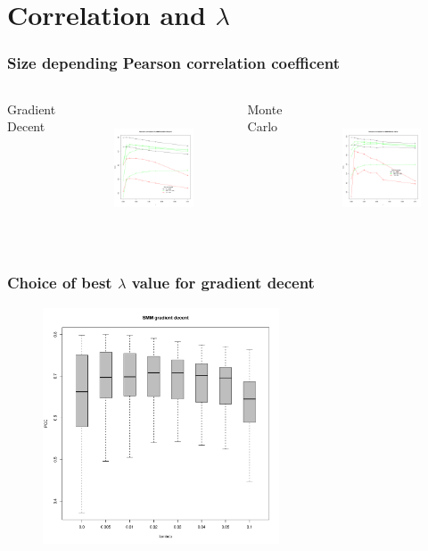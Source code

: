 \documentclass[presentation]{beamer}   %
\begin{document}
\section{Correlation and $\lambda$}
\begin{frame}
  \frametitle{Size depending Pearson correlation coefficent}
  \begin{columns}[t] %
		\centering Gradient Decent
		\begin{figure}
		\centering
			\includegraphics[width=40mm,height=40mm]{fig/smm_l005_ppc_size.pdf}
		\end{figure}
		\centering Monte Carlo
		\begin{figure}
			\centering
			\includegraphics[width=40mm,height=40mm]{fig/smm_mc_l005_ppc_size.pdf}
		\end{figure}
  \end{columns}
\end{frame}

\begin{frame}[plain]
  \frametitle{Choice of best $\lambda$ value for gradient decent}
	\begin{figure}
	\centering
		\includegraphics[width=70mm,height=70mm]{fig/choice_lambda.pdf}
	\end{figure}
\end{frame}
\end{document}
